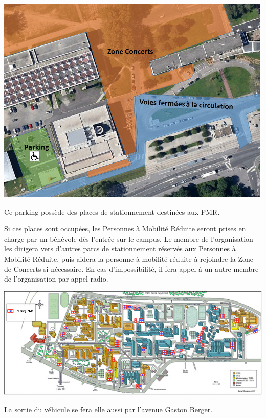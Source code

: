 \documentclass[hidelinks, paper=a4, fontsize=13pt]{report}
\begin{document}
\begin{center}
\includegraphics[width=\textwidth,keepaspectratio]{Annexes/Images/PMR_entree2}
\end{center}
Ce parking possède des places de stationnement destinées aux PMR.

Si ces places sont occupées, les Personnes à Mobilité Réduite seront prises en charge par un bénévole dès l’entrée sur le campus. Le membre de l’organisation les dirigera vers d’autres parcs de stationnement réservés aux Personnes à Mobilité Réduite, puis aidera la personne à mobilité réduite à rejoindre la Zone de Concerts si nécessaire. En cas d’impossibilité, il fera appel à un autre membre de l’organisation par appel radio.

\begin{center}
\includegraphics[scale=1]{Annexes/Images/parkingPMRDOUA}
\end{center}

La sortie du véhicule se fera elle aussi par l'avenue Gaston Berger.
\end{document}
